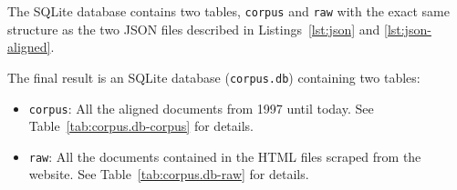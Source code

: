 The SQLite database contains two tables, \texttt{corpus} and \texttt{raw} with the exact same structure as the two JSON files described in Listings~\ref{lst:json} and \ref{lst:json-aligned}.

The final result is an SQLite database (\texttt{corpus.db}) containing two tables:
\begin{itemize}
	\item \texttt{corpus}: All the aligned documents from 1997 until today. See Table~\ref{tab:corpus.db-corpus} for details.




	\item \texttt{raw}: All the documents contained in the HTML files scraped from the website. 
	See Table~\ref{tab:corpus.db-raw} for details. 
\end{itemize}

